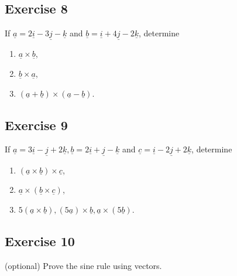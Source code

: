\documentclass[
  11pt,
  oneside]{book}
\providecommand{\tightlist}{%
  \setlength{\itemsep}{0pt}\setlength{\parskip}{0pt}}
\newcommand{\slide}{}
\theoremstyle{definition}
\theoremstyle{definition}
\theoremstyle{definition}
\theoremstyle{definition}
\theoremstyle{remark}
\begin{document}
\slide

\subsection*{Exercise 8}\label{exercise-8-2}

If \(\underline{a} = 2\underline{i} - 3\underline{j} - \underline{k}\) and \(\underline{b} = \underline{i} + 4\underline{j} - 2\underline{k}\), determine

\begin{enumerate}
\def\labelenumi{\roman{enumi}.}
\tightlist
\item
  \(\underline{a} \times \underline{b}\),
\item
  \(\underline{b} \times \underline{a}\),
\item
  \((\underline{a} + \underline{b}) \times (\underline{a} - \underline{b})\).
\end{enumerate}

\slide

\subsection*{Exercise 9}\label{exercise-9-2}

If \(\underline{a} = 3\underline{i} - \underline{j} + 2\underline{k}, \underline{b} = 2\underline{i} + \underline{j} - \underline{k}\) and \(\underline{c} = \underline{i} - 2\underline{j} + 2\underline{k}\), determine

\begin{enumerate}
\def\labelenumi{\roman{enumi}.}
\tightlist
\item
  \((\underline{a} \times \underline{b}) \times \underline{c}\),
\item
  \(\underline{a} \times (\underline{b} \times \underline{c})\),
\item
  \(5(\underline{a} \times \underline{b}), (5\underline{a})\times \underline{b}, \underline{a}\times(5\underline{b})\).
\end{enumerate}

\slide

\subsection*{Exercise 10}\label{exercise-10-1}

(optional) Prove the sine rule using vectors.
\end{document}
